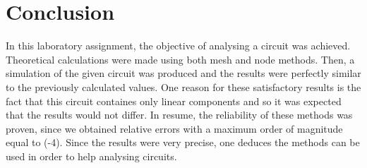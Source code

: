 \section{Conclusion}
\label{sec:conclusion}

In this laboratory assignment, the objective of analysing a circuit was achieved. Theoretical calculations were made using both mesh and node methods. Then, a simulation of the given circuit was produced and the results were perfectly similar to the previously calculated values.
One reason for these satisfactory results is the fact that this circuit containes only linear components and so it was expected that the results would not differ.
In resume, the reliability of these methods was proven, since we obtained relative errors with a maximum order of magnitude equal to (-4). Since the results were very precise, one deduces the methods can be used in order to help analysing circuits.
